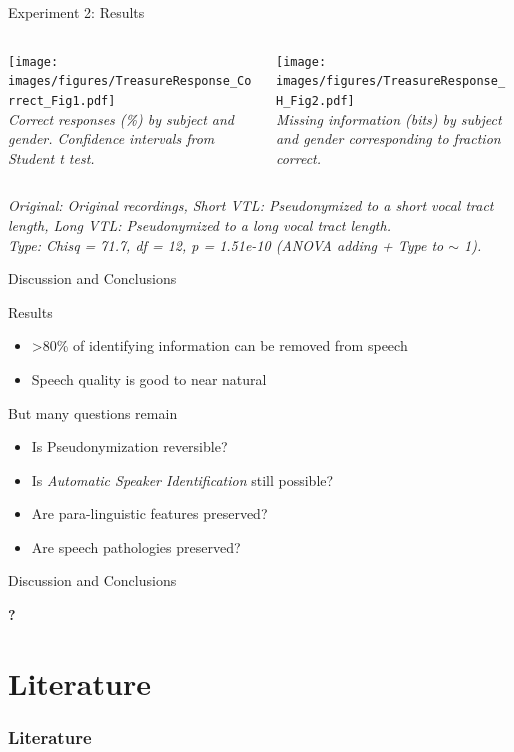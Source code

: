 \documentclass[xcolor={dvipsnames}]{beamer}
\begin{document}
\begin{frame}{Experiment 2: Results}
    \begin{columns}
        \centering
        \begin{column}{0.48\textwidth}
        \texttt{[image: images/figures/TreasureResponse\_Correct\_Fig1.pdf]} \\
        \scriptsize{\textit{Correct responses (\%) by subject and gender.
        Confidence intervals from Student t test.}}
        \end{column}
        \begin{column}{0.48\textwidth}
        \texttt{[image: images/figures/TreasureResponse\_H\_Fig2.pdf]}\\
        \scriptsize{\textit{Missing information (bits) by subject and gender corresponding to fraction correct.}}

        \end{column}
    \end{columns}
    \vskip 0.8cm
    \scriptsize{\textit{Original: Original recordings, Short VTL: Pseudonymized to a short vocal tract length, Long VTL: Pseudonymized to a long vocal tract length.\\
Type: Chisq = 71.7, df = 12, p = 1.51e-10 (ANOVA adding + Type to $\sim$ 1).}}
\end{frame}

\begin{frame}{Discussion and Conclusions}

\begin{block}{Results}
\begin{itemize}
    \item >80\% of identifying information can be removed from speech
    \item Speech quality is good to near natural
\end{itemize}
\end{block}
 \begin{block}{But many questions remain}
\begin{itemize}
    \item Is Pseudonymization reversible?
    \item Is {\em Automatic Speaker Identification} still possible?
    \item Are para-linguistic features preserved?
    \item Are speech pathologies preserved?
\end{itemize}
\end{block}

\end{frame}

\begin{frame}{Discussion and Conclusions}

\centering
{\fontsize{72pt}{92pt}\selectfont \textbf{?}}

\end{frame}

\section{Literature}

\begin{frame}[allowframebreaks]
        \frametitle{Literature}
        \printbibliography
\end{frame}
\end{document}
